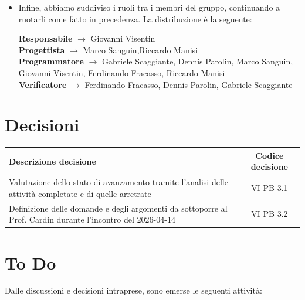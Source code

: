 \documentclass[a4paper,12pt]{article}
\newcommand{\ignoreglossary}{}
\begin{document}
\begin{itemize}
\begin{itemize}
\begin{itemize}
        \item Backend Dead man’s Switch.
    \end{itemize}
    \item Verificatore:
    \begin{itemize}
        \item Verifica e controllo del passaggio dei test.
    \end{itemize}
\end{itemize}
    \item Infine, abbiamo suddiviso i ruoli tra i membri del gruppo, continuando a ruotarli come fatto in precedenza. La distribuzione è la seguente:
    \begin{center}
        \textbf{Responsabile} $\rightarrow$ Giovanni Visentin\\
        \textbf{Progettista} $\rightarrow$ Marco Sanguin,Riccardo Manisi\\
        \textbf{Programmatore} $\rightarrow$ Gabriele Scaggiante, Dennis Parolin, Marco Sanguin, Giovanni Visentin, Ferdinando Fracasso, Riccardo Manisi\\
        \textbf{Verificatore} $\rightarrow$ Ferdinando Fracasso, Dennis Parolin, Gabriele Scaggiante
    \end{center}
\end{itemize}

\section{Decisioni}
\begin{center}
\small
\renewcommand{\arraystretch}{1.2} 
\begin{tabular}{|p{}|c|}
\hline
\rowcolor{gray!60} 
\textbf{Descrizione decisione} & \textbf{Codice decisione} \\
\hline
Valutazione dello stato di avanzamento tramite l'analisi delle attività completate e di quelle arretrate & VI \ignoreglossary{PB} 3.1 \\
\hline
Definizione delle domande e degli argomenti da sottoporre al Prof. Cardin durante l'incontro del 2026-04-14 & VI \ignoreglossary{PB} 3.2 \\
\hline
\end{tabular}
\end{center}
\pagebreak
\section{To Do}
Dalle discussioni e decisioni intraprese, sono emerse le seguenti attività:
\end{document}
